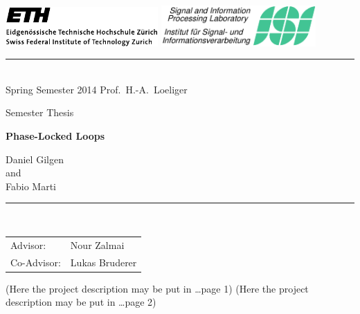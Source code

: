 \documentclass[11pt,a4paper,twoside]{report}
\begin{document}
\pagestyle{plain}

\begin{titlepage}
  \begin{center}
    \includegraphics[height=15mm]{gfx/ethlogo} \hfill
    \includegraphics[height=15.5mm]{gfx/isilogo_left}
    \rule{\textwidth}{0.5pt}\\[1ex]
    {\Large Spring Semester 2014 \hfill 
      Prof.~H.-A.~Loeliger
    }

    \LARGE Semester Thesis

    \Huge\textbf{
      Phase-Locked Loops
    }
    
    \LARGE{
      Daniel Gilgen\\
      and \\
      Fabio Marti \\
    }
    
  \end{center}
  \rule{\textwidth}{0.5pt}\\[2ex]
  \noindent
  \begin{tabular}{@{}ll@{}}
    \Large Advisor: & \Large Nour Zalmai\\[1ex]
    \Large Co-Advisor: & \Large Lukas Bruderer
  \end{tabular}
\end{titlepage}

\cleardoublepage
(Here the project description may be put in \ldots page 1)
\clearpage
(Here the project description may be put in \ldots page 2)
\cleardoublepage




\pagestyle{fancy}
\renewcommand{\chaptermark}[1]{\markboth{#1}{}}
\renewcommand{\sectionmark}[1]{\markright{\thesection\ #1}}
\fancyhead{}
\end{document}
